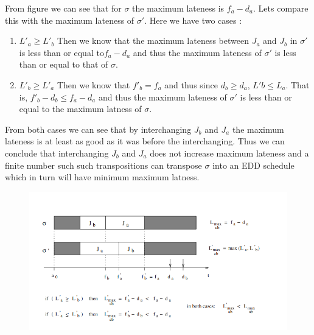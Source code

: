 \documentclass{hw}
\begin{document}
From figure  we can see that for $\sigma$ the maximum lateness is
$f_a - d_a$. Lets compare this with the maximum lateness of $\sigma '$. Here we
have two cases :

\begin{enumerate}
  \item $L'_a \geq L'_b$ Then we know that the maximum lateness between $J_a$
    and $J_b$ in $\sigma '$ is less than or equal to$f_a - d_a$ and thus the
    maximum lateness of $\sigma '$ is less than or equal to that of $\sigma$.
  \item $L'_b \geq L'_a$ Then we know that $f'_b = f_a$ and thus since $d_b
    \geq d_a$, $L'b \leq L_a$. That is, $f'_b - d_b \leq f_a - d_a$ and thus
    the maximum lateness of $\sigma '$ is less than or equal to the maximum
    latness of $\sigma$.
\end{enumerate}

From both cases we can see that by interchanging $J_b$ and $J_a$ the maximum
lateness is at least as good as it was before the interchanging. Thus we can
conclude that interchanging $J_b$ and $J_a$ does not increase maximum lateness
and a finite number such such transpositions can transpose $\sigma$ into an EDD
schedule which in turn will have minimum maximum latness. 
\begin{figure}[H]
  \centering
  \includegraphics[scale=0.75]{img/jacksons}
  \label{fig:jackson}
\end{figure}
\end{document}
